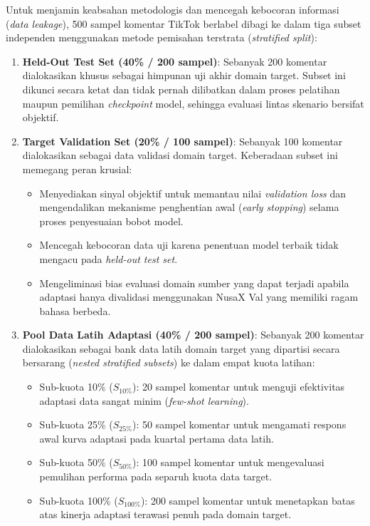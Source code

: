 Untuk menjamin keabsahan metodologis dan mencegah kebocoran informasi (\textit{data leakage}), 500 sampel komentar TikTok berlabel dibagi ke dalam tiga subset independen menggunakan metode pemisahan terstrata (\textit{stratified split}):
\begin{enumerate}
    \item \textbf{Held-Out Test Set (40\% / 200 sampel)}: Sebanyak 200 komentar dialokasikan khusus sebagai himpunan uji akhir domain target. Subset ini dikunci secara ketat dan tidak pernah dilibatkan dalam proses pelatihan maupun pemilihan \textit{checkpoint} model, sehingga evaluasi lintas skenario bersifat objektif.
    \item \textbf{Target Validation Set (20\% / 100 sampel)}: Sebanyak 100 komentar dialokasikan sebagai data validasi domain target. Keberadaan subset ini memegang peran krusial:
    \begin{itemize}
        \item Menyediakan sinyal objektif untuk memantau nilai \textit{validation loss} dan mengendalikan mekanisme penghentian awal (\textit{early stopping}) selama proses penyesuaian bobot model.
        \item Mencegah kebocoran data uji karena penentuan model terbaik tidak mengacu pada \textit{held-out test set}.
        \item Mengeliminasi bias evaluasi domain sumber yang dapat terjadi apabila adaptasi hanya divalidasi menggunakan NusaX Val yang memiliki ragam bahasa berbeda.
    \end{itemize}
    \item \textbf{Pool Data Latih Adaptasi (40\% / 200 sampel)}: Sebanyak 200 komentar dialokasikan sebagai bank data latih domain target yang dipartisi secara bersarang (\textit{nested stratified subsets}) ke dalam empat kuota latihan:
    \begin{itemize}
        \item Sub-kuota 10\% ($S_{10\%}$): 20 sampel komentar untuk menguji efektivitas adaptasi data sangat minim (\textit{few-shot learning}).
        \item Sub-kuota 25\% ($S_{25\%}$): 50 sampel komentar untuk mengamati respons awal kurva adaptasi pada kuartal pertama data latih.
        \item Sub-kuota 50\% ($S_{50\%}$): 100 sampel komentar untuk mengevaluasi pemulihan performa pada separuh kuota data target.
        \item Sub-kuota 100\% ($S_{100\%}$): 200 sampel komentar untuk menetapkan batas atas kinerja adaptasi terawasi penuh pada domain target.
    \end{itemize}
\end{enumerate}

